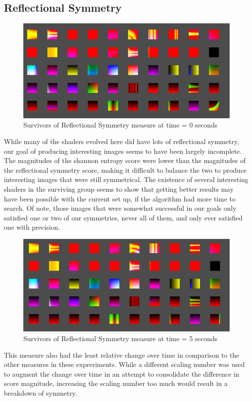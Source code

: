 \documentclass{acmart}
\begin{document}
\subsection*{Reflectional Symmetry}

\begin{figure}[h!]
    \caption{Survivors of Reflectional Symmetry measure at time = 0 seconds}
    \includegraphics[width =\textwidth]{Reflectional_0.PNG}
\end{figure}
While many of the shaders evolved here did have lots of reflectional symmetry, our goal of producing interesting images seems to have been largely incomplete. The magnitudes of the 
shannon entropy score were lower than the magnitudes of the reflectional symmetry score, making it difficult to balance the two to produce interesting images that were still symmetrical. 
The existence of several interesting shaders in the surviving group seems to show that getting better results may have been possible with the current set up, if the algorithm had more time to search.
Of note, those images that were somewhat successful in our goals only satisfied one or two of our symmetries, never all of them, and only ever satisfied one with precision.

\begin{figure}[h!]
    \caption{Survivors of Reflectional Symmetry measure at time = 5 seconds}
    \includegraphics[width =\textwidth]{Reflectional_5.PNG}
\end{figure}
This measure also had the least relative change over time in comparison to the other measures in these expreriments. While a different scaling number was used to augment the change over time in an 
attempt to consolidate the difference in score magnitude, increasing the scaling number too much would result in a breakdown of symmetry.
\end{document}
